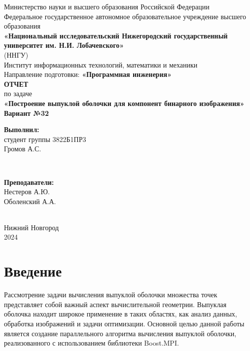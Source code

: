 \documentclass[a4paper,12pt]{article}
\begin{document}
\begin{titlepage}
    \centering
    \large
    Министерство науки и высшего образования Российской Федерации\\[0.5cm]
    Федеральное государственное автономное образовательное учреждение высшего образования\\[0.5cm]
    \textbf{«Национальный исследовательский Нижегородский государственный университет им. Н.И. Лобачевского»}\\
    (ННГУ)\\[1cm]
    Институт информационных технологий, математики и механики\\[0.5cm]
    Направление подготовки: \textbf{«Программная инженерия»}\\[1.5cm]

    \vfill
    {\LARGE \textbf{ОТЧЕТ}}\\[0.5cm]
    {\Large по задаче}\\[0.5cm]
    {\LARGE \textbf{«Построение выпуклой оболочки для компонент бинарного изображения»}}\\[0.5cm]
    {\Large \textbf{Вариант №32}}\\[2.5cm]

    \hfill\parbox{0.5\textwidth}{
        \textbf{Выполнил:} \\
        студент группы 3822Б1ПР3 \\
        Громов А.С.
    }\\[0.5cm]

    \hfill\parbox{0.5\textwidth}{
        \textbf{Преподаватели:} \\
        Нестеров А.Ю.\\
        Оболенский А.А.

    }\\[2cm]

    Нижний Новгород\\
    2024
\end{titlepage}
\tableofcontents
\newpage

\section{Введение}

\hspace*{1.25em}Рассмотрение задачи вычисления выпуклой оболочки множества точек представляет собой важный аспект вычислительной геометрии. Выпуклая оболочка находит широкое применение в таких областях, как анализ данных, обработка изображений и задачи оптимизации. Основной целью данной работы является создание параллельного алгоритма вычисления выпуклой оболочки, реализованного с использованием библиотеки Boost.MPI.
\end{document}
